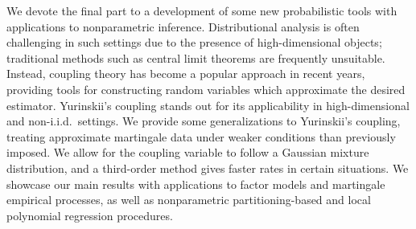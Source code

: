 We devote the final part to a development of some new probabilistic tools with
applications to nonparametric inference. Distributional analysis is often
challenging in such settings due to the presence of high-dimensional objects;
traditional methods such as central limit theorems are frequently unsuitable.
Instead, coupling theory has become a popular approach in recent years,
providing tools for constructing random variables which approximate the desired
estimator. Yurinskii's coupling stands out for its applicability in
high-dimensional and non-i.i.d.\ settings. We provide some generalizations to
Yurinskii's coupling, treating approximate martingale data under weaker
conditions than previously imposed. We allow for the coupling variable to
follow a Gaussian mixture distribution, and a third-order method gives faster
rates in certain situations. We showcase our main results with applications to
factor models and martingale empirical processes, as well as nonparametric
partitioning-based and local polynomial regression procedures.
